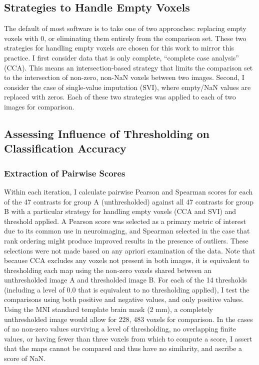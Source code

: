 \documentclass{report}
\begin{document}
\subsection{Strategies to Handle Empty Voxels}

The default of most software is to take one of two approaches: replacing
empty voxels with 0, or eliminating them entirely from the comparison
set. These two strategies for handling empty voxels are chosen for this
work to mirror this practice. I first consider data that is only
complete, ``complete case analysis'' (CCA). This means an
intersection-based strategy that limits the comparison set to the
intersection of non-zero, non-NaN voxels between two images. Second, I
consider the case of single-value imputation (SVI), where empty/NaN
values are replaced with zeros. Each of these two strategies was applied
to each of two images for comparison.

\subsection{Assessing Influence of Thresholding on Classification Accuracy}

\subsubsection{Extraction of Pairwise Scores}

Within each iteration, I calculate pairwise Pearson and Spearman scores
for each of the 47 contrasts for group A (unthresholded) against all 47
contrasts for group B with a particular strategy for handling empty
voxels (CCA and SVI) and threshold applied. A Pearson score was selected as a primary metric of interest due to its common use in neuroimaging, and Spearman selected in the case that rank ordering might produce improved results in the presence of outliers. These selections were not made based on any apriori examination of the data. Note that because CCA
excludes any voxels not present in both images, it is equivalent to
thresholding each map using the non-zero voxels shared between an
unthresholded image A and thresholded image B. For each of the 14
thresholds (including a level of 0.0 that is equivalent to no
thresholding applied), I test the comparisons using both positive and
negative values, and only positive values. Using the MNI standard
template brain mask (2 mm), a completely unthresholded image would allow
for 228, 483 voxels for comparison. In the cases of no non-zero values
surviving a level of thresholding, no overlapping finite values, or
having fewer than three voxels from which to compute a score, I assert
that the maps cannot be compared and thus have no similarity, and
ascribe a score of NaN.
\end{document}
